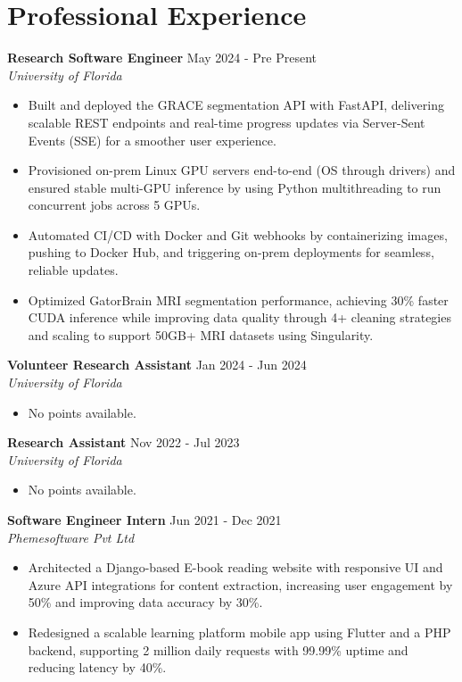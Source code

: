 \documentclass[a4paper,10pt]{article}
\begin{document}
\section*{Professional Experience}
\vspace{-3pt}
\textbf{Research Software Engineer} \hfill May 2024 - Pre Present \\
\textit{University of Florida}
\begin{itemize}
\item Built and deployed the GRACE segmentation API with FastAPI, delivering scalable REST endpoints and real-time progress updates via Server-Sent Events (SSE) for a smoother user experience.
\item Provisioned on-prem Linux GPU servers end-to-end (OS through drivers) and ensured stable multi-GPU inference by using Python multithreading to run concurrent jobs across 5 GPUs.
\item Automated CI/CD with Docker and Git webhooks by containerizing images, pushing to Docker Hub, and triggering on-prem deployments for seamless, reliable updates.
\item Optimized GatorBrain MRI segmentation performance, achieving 30\% faster CUDA inference while improving data quality through 4+ cleaning strategies and scaling to support 50GB+ MRI datasets using Singularity.
\end{itemize}
\vspace{-6pt}
\textbf{Volunteer Research Assistant} \hfill Jan 2024 - Jun 2024 \\
\textit{University of Florida}
\begin{itemize}
\item No points available.
\end{itemize}
\vspace{-6pt}
\textbf{Research Assistant} \hfill Nov 2022 - Jul 2023 \\
\textit{University of Florida}
\begin{itemize}
\item No points available.
\end{itemize}
\vspace{-6pt}
\textbf{Software Engineer Intern} \hfill Jun 2021 - Dec 2021 \\
\textit{Phemesoftware Pvt Ltd}
\begin{itemize}
\item Architected a Django-based E-book reading website with responsive UI and Azure API integrations for content extraction, increasing user engagement by 50\% and improving data accuracy by 30\%.
\item Redesigned a scalable learning platform mobile app using Flutter and a PHP backend, supporting 2 million daily requests with 99.99\% uptime and reducing latency by 40\%.
\end{itemize}
\end{document}
